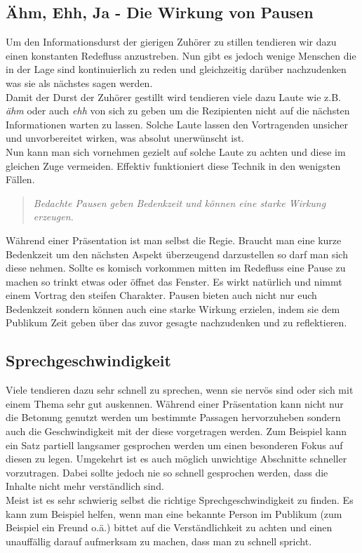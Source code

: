 \documentclass[../main.tex]{subfiles}
\begin{document}
        \subsection[Pausen]{Ähm, Ehh, Ja - Die Wirkung von Pausen}
            Um den Informationsdurst der gierigen Zuhörer zu stillen tendieren wir dazu einen konstanten Redefluss anzustreben. Nun gibt es jedoch wenige Menschen die in der Lage sind kontinuierlich zu reden und gleichzeitig darüber nachzudenken was sie als nächstes sagen werden.\\
            Damit der Durst der Zuhörer gestillt wird tendieren viele dazu Laute wie z.B. \emph{ähm} oder auch \emph{ehh} von sich zu geben um die Rezipienten nicht auf die nächsten Informationen warten zu lassen. Solche Laute lassen den Vortragenden unsicher und unvorbereitet wirken, was absolut unerwünscht ist.\\
            Nun kann man sich vornehmen gezielt auf solche Laute zu achten und diese im gleichen Zuge vermeiden. Effektiv funktioniert diese Technik in den wenigsten Fällen.
            \begin{quote}
                \emph{Bedachte Pausen geben Bedenkzeit und können eine starke Wirkung erzeugen.}
            \end{quote}
            Während einer Präsentation ist man selbst die Regie. Braucht man eine kurze Bedenkzeit um den nächsten Aspekt überzeugend darzustellen so darf man sich diese nehmen. Sollte es komisch vorkommen mitten im Redefluss eine Pause zu machen so trinkt etwas oder öffnet das Fenster. Es wirkt natürlich und nimmt einem Vortrag den steifen Charakter. Pausen bieten auch nicht nur euch Bedenkzeit sondern können auch eine starke Wirkung erzielen, indem sie dem Publikum Zeit geben über das zuvor gesagte nachzudenken und zu reflektieren.
            
        \subsection{Sprechgeschwindigkeit}
        	Viele tendieren dazu sehr schnell zu sprechen, wenn sie nervös sind oder sich mit einem Thema sehr gut auskennen. Während einer Präsentation kann nicht nur die Betonung genutzt werden um bestimmte Passagen hervorzuheben sondern auch die Geschwindigkeit mit der diese vorgetragen werden. Zum Beispiel kann ein Satz partiell langsamer gesprochen werden um einen besonderen Fokus auf diesen zu legen. Umgekehrt ist es auch möglich unwichtige Abschnitte schneller vorzutragen. Dabei sollte jedoch nie so schnell gesprochen werden, dass die Inhalte nicht mehr verständlich sind.\\
        	Meist ist es sehr schwierig selbst die richtige Sprechgeschwindigkeit zu finden. Es kann zum Beispiel helfen, wenn man eine bekannte Person im Publikum (zum Beispiel ein Freund o.ä.) bittet auf die Verständlichkeit zu achten und einen unauffällig darauf aufmerksam zu machen, dass man zu schnell spricht. 
        
\end{document}
